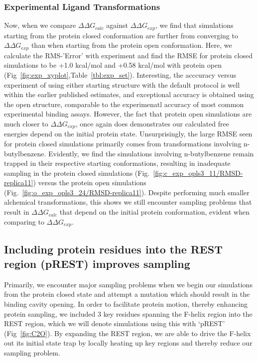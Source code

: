 \documentclass[journal=jctcce,manuscript=article]{achemso}
\begin{document}
\subsubsection*{Experimental Ligand Transformations}
Now, when we compare $\Delta\Delta G_{calc}$ against $\Delta\Delta G_{exp}$, we find that simulations starting from the protein closed conformation are further from converging to $\Delta\Delta G_{exp}$ than when starting from the protein open conformation. 
Here, we calculate the RMS-'Error' with experiment and find the RMSE for protein closed simulations to be +1.0 kcal/mol and +0.58 kcal/mol with protein open (Fig~\ref{fig:exp_xyplot},Table~\ref{tbl:exp_set}).
Interesting, the acccuracy versus experiment of using either starting structure with the default protocol is well within the earlier published estimates, and exceptional accuracy is obtained using the open structure, comparable to the experimenatl accuracy of most common experimental binding assays.
However, the fact that protein open simulations are much closer to $\Delta\Delta G_{exp}$, once again does demonstrates our calculated free energies depend on the initial protein state.
Unsurprisingly, the large RMSE seen for protein closed simulations primarily comes from transformations involving n-butylbenzene.
Evidently, we find the simulations involving n-butylbenzene remain trapped in their respective starting conformations, resulting in inadequate sampling in the protein closed simulations (Fig.~\ref{fig:c_exp_opls3_11/RMSD-replica11}) versus the protein open simulations (Fig.~\ref{fig:o_exp_opls3_24/RMSD-replica11}).
Despite performing much smaller alchemical transformations, this shows we still encounter sampling problems that result in $\Delta\Delta G_{calc}$ that depend on the initial protein conformation, evident when comparing to $\Delta\Delta G_{exp}$.

\subsection*{Including protein residues into the REST region (pREST) improves sampling}
Primarily, we encounter major sampling problems when we begin our simulations from the protein closed state and attempt a mutation which should result in the binding cavity opening.
In order to facilitate protein motion, thereby enhancing protein sampling, we included 3 key residues spanning the F-helix region into the REST region, which we will denote simulations using this with `pREST' (Fig~\ref{fig:C2O}).
By expanding the REST region, we are able to drive the F-helix out its initial state trap by locally heating up key regions and thereby reduce our sampling problem.
\end{document}

